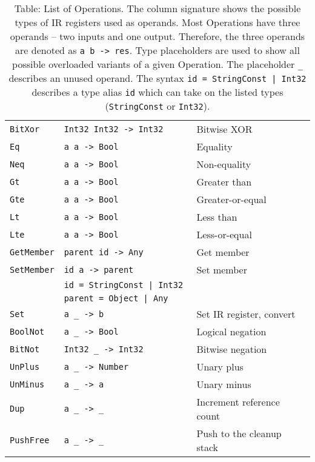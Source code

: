 \begin{table}
\begin{tabular}{l | l | l}
        \texttt{BitXor}      & \texttt{Int32  Int32 -> Int32    } &  Bitwise XOR                \\
        \texttt{Eq}          & \texttt{a      a     -> Bool     } &  Equality                   \\
        \texttt{Neq}         & \texttt{a      a     -> Bool     } &  Non-equality               \\
        \texttt{Gt}          & \texttt{a      a     -> Bool     } &  Greater than               \\
        \texttt{Gte}         & \texttt{a      a     -> Bool     } &  Greater-or-equal           \\
        \texttt{Lt}          & \texttt{a      a     -> Bool     } &  Less than                  \\
        \texttt{Lte}         & \texttt{a      a     -> Bool     } &  Less-or-equal              \\
        \texttt{GetMember}   & \texttt{parent id    -> Any      } &  Get member                 \\
        \texttt{SetMember}   & \texttt{id     a     -> parent   } &  Set member                 \\
                             & \texttt{id = StringConst | Int32 } &                             \\
                             & \texttt{parent = Object | Any    } &                             \\
        \texttt{Set}         & \texttt{a      \_    -> b        } &  Set IR register, convert   \\
        \texttt{BoolNot}     & \texttt{a      \_    -> Bool     } &  Logical negation           \\
        \texttt{BitNot}      & \texttt{Int32  \_    -> Int32    } &  Bitwise negation           \\
        \texttt{UnPlus}      & \texttt{a      \_    -> Number   } &  Unary plus                 \\
        \texttt{UnMinus}     & \texttt{a      \_    -> a        } &  Unary minus                \\
        \texttt{Dup}         & \texttt{a      \_    -> \_       } &  Increment reference count  \\
        \texttt{PushFree}    & \texttt{a      \_    -> \_       } &  Push to the cleanup stack  \\
    \end{tabular}
    \caption{Table: List of Operations. The column signature shows the possible types of IR registers used as operands. Most Operations have three operands -- two inputs and one output. Therefore, the three operands are denoted as \texttt{a b -> res}. Type placeholders are used to show all possible overloaded variants of a given Operation. The placeholder \texttt{\_} describes an unused operand. The syntax \texttt{id = StringConst | Int32} describes a type alias \texttt{id} which can take on the listed types (\texttt{StringConst} or \texttt{Int32}). }
    \label{tab:opcodes}
\end{table}

